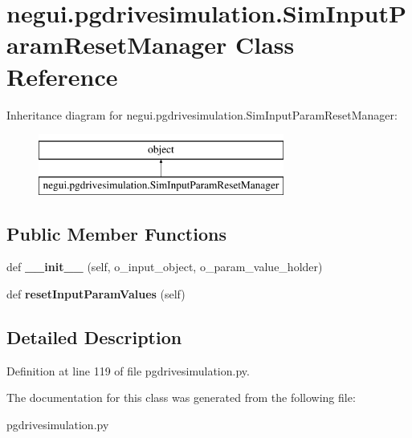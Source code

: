 \hypertarget{classnegui_1_1pgdrivesimulation_1_1SimInputParamResetManager}{}\section{negui.\+pgdrivesimulation.\+Sim\+Input\+Param\+Reset\+Manager Class Reference}
\label{classnegui_1_1pgdrivesimulation_1_1SimInputParamResetManager}
Inheritance diagram for negui.\+pgdrivesimulation.\+Sim\+Input\+Param\+Reset\+Manager\+:\begin{figure}[H]
\begin{center}
\leavevmode
\includegraphics[height=2.000000cm]{classnegui_1_1pgdrivesimulation_1_1SimInputParamResetManager}
\end{center}
\end{figure}
\subsection*{Public Member Functions}
\begin{DoxyCompactItemize}
\item 
def {\bfseries \+\_\+\+\_\+init\+\_\+\+\_\+} (self, o\+\_\+input\+\_\+object, o\+\_\+param\+\_\+value\+\_\+holder)\hypertarget{classnegui_1_1pgdrivesimulation_1_1SimInputParamResetManager_adce150f1f71039b4f99c7fa3227d12d6}{}\label{classnegui_1_1pgdrivesimulation_1_1SimInputParamResetManager_adce150f1f71039b4f99c7fa3227d12d6}

\item 
def {\bfseries reset\+Input\+Param\+Values} (self)\hypertarget{classnegui_1_1pgdrivesimulation_1_1SimInputParamResetManager_adc4fd86ea965d1412e14ccc424b789f6}{}\label{classnegui_1_1pgdrivesimulation_1_1SimInputParamResetManager_adc4fd86ea965d1412e14ccc424b789f6}

\end{DoxyCompactItemize}


\subsection{Detailed Description}


Definition at line 119 of file pgdrivesimulation.\+py.



The documentation for this class was generated from the following file\+:\begin{DoxyCompactItemize}
\item 
pgdrivesimulation.\+py\end{DoxyCompactItemize}
